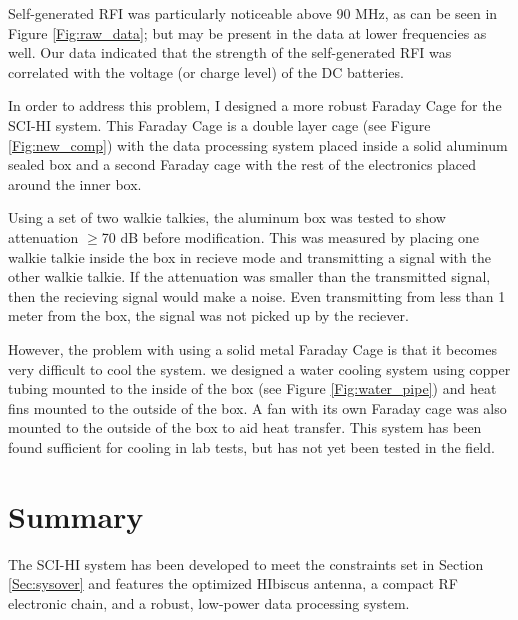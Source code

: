 Self-generated RFI was particularly noticeable above 90 MHz, as can be seen in Figure \ref{Fig:raw_data}; but may be present in the data at lower frequencies as well. Our data indicated that the strength of the self-generated RFI was correlated with the voltage (or charge level) of the DC batteries. 

In order to address this problem, I designed a more robust Faraday Cage for the SCI-HI system. This Faraday Cage is a double layer cage (see Figure \ref{Fig:new_comp}) with the data processing system placed inside a solid aluminum sealed box and a second Faraday cage with the rest of the electronics placed around the inner box. 

Using a set of two walkie talkies, the aluminum box was tested to show attenuation $\geq$70 dB before modification. This was measured by placing one walkie talkie inside the box in recieve mode and transmitting a signal with the other walkie talkie. If the attenuation was smaller than the transmitted signal, then the recieving signal would make a noise. Even transmitting from less than 1 meter from the box, the signal was not picked up by the reciever. 

However, the problem with using a solid metal Faraday Cage is that it becomes very difficult to cool the system. we designed a water cooling system using copper tubing mounted to the inside of the box (see Figure \ref{Fig:water_pipe}) and heat fins mounted to the outside of the box. A fan with its own Faraday cage was also mounted to the outside of the box to aid heat transfer. This system has been found sufficient for cooling in lab tests, but has not yet been tested in the field. 



\section{Summary}

The SCI-HI system has been developed to meet the constraints set in Section \ref{Sec:sysover} and features the optimized HIbiscus antenna, a compact RF electronic chain, and a robust, low-power data processing system. 

